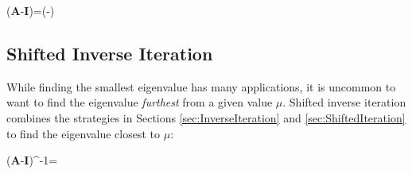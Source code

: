 \beq
\left(\textbf{A}-\mu\textbf{I}\right)=\left(\lambda-\mu\right)
\eeq 

\subsection{Shifted Inverse Iteration}
While finding the smallest eigenvalue has many applications, it is uncommon to want to find the eigenvalue {\it furthest} from a given value \(\mu\). Shifted inverse iteration combines the strategies in Sections \ref{sec:InverseIteration} and \ref{sec:ShiftedIteration} to find the eigenvalue closest to \(\mu\):

\beq
\left(\textbf{A}-\mu\textbf{I}\right)^{-1}=
\eeq